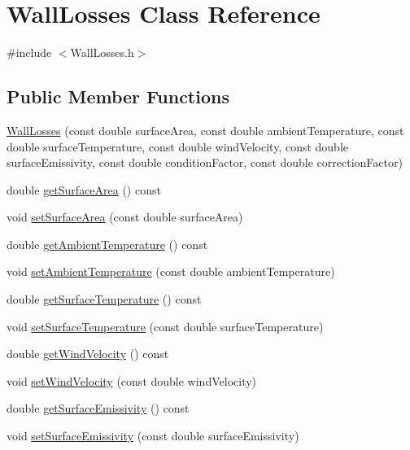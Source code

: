 \hypertarget{class_wall_losses}{}\section{Wall\+Losses Class Reference}
\label{class_wall_losses}


{\ttfamily \#include $<$Wall\+Losses.\+h$>$}

\subsection*{Public Member Functions}
\begin{DoxyCompactItemize}
\item 
\hyperlink{class_wall_losses_a7d46f259c632ecdcde5ae31468c03e2e}{Wall\+Losses} (const double surface\+Area, const double ambient\+Temperature, const double surface\+Temperature, const double wind\+Velocity, const double surface\+Emissivity, const double condition\+Factor, const double correction\+Factor)
\item 
double \hyperlink{class_wall_losses_ad4d3aa549cc7ab19e927823dbafed973}{get\+Surface\+Area} () const
\item 
void \hyperlink{class_wall_losses_acbbbe4b1ec44bb04e5e1db944017995c}{set\+Surface\+Area} (const double surface\+Area)
\item 
double \hyperlink{class_wall_losses_a806cb5860fe78d0379e3877f043655ad}{get\+Ambient\+Temperature} () const
\item 
void \hyperlink{class_wall_losses_a08a8f4c9add0ce78733be4558cc8410b}{set\+Ambient\+Temperature} (const double ambient\+Temperature)
\item 
double \hyperlink{class_wall_losses_ac2ce3cea6eef435a5fcf6a659b8e7d70}{get\+Surface\+Temperature} () const
\item 
void \hyperlink{class_wall_losses_a7aaa1bd0d7e0ec67db33668ccc6c48da}{set\+Surface\+Temperature} (const double surface\+Temperature)
\item 
double \hyperlink{class_wall_losses_ae68657cacdfbaf8cdc48324dd580cf3b}{get\+Wind\+Velocity} () const
\item 
void \hyperlink{class_wall_losses_ae376b7ce4e5b3c45a663395802c176a9}{set\+Wind\+Velocity} (const double wind\+Velocity)
\item 
double \hyperlink{class_wall_losses_ae1fce9523d14831ef6bc9b7823d5ea08}{get\+Surface\+Emissivity} () const
\item 
void \hyperlink{class_wall_losses_ad0ebd1a0a1b32a2358da15b6c8e63d3a}{set\+Surface\+Emissivity} (const double surface\+Emissivity)

\end{DoxyCompactItemize}
